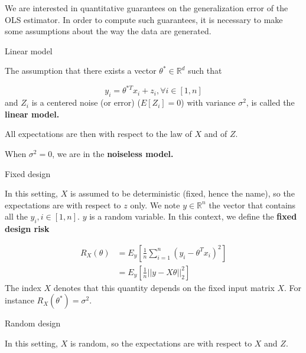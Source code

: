 \documentclass[
10pt, %
a4paper, %
oneside, %
headinclude,footinclude, %
BCOR5mm, %
]{scrartcl}
\begin{document}
We are interested in quantitative guarantees on the generalization error of the OLS estimator. In order to compute such guarantees, it is necessary to make some assumptions about the way the data are generated.

\begin{definition}{Linear model}

    The assumption that there exists a vector $ \theta^*\in \mathbb{R}^d$ such that 

    \begin{equation*}
	y_i = \theta^{*T}x_i+z_i, \forall i\in [1, n]
    \end{equation*}
    and $Z_i$ is a centered noise (or error)  ($E[Z_i]=0$) with variance $ \sigma^2$, is called the \textbf{{linear model.}} 
\end{definition}

All expectations are then with respect to the law of $X$ and of $Z$.

\begin{remark}

    When $\sigma^2=0$, we are in the \textbf{{noiseless model.}} 
    
\end{remark}

\begin{definition}{Fixed design}

    In this setting, $X$ is assumed to be deterministic (fixed, hence the name), so the expectations are with respect to $z$ only. We note $y\in \mathbb{R}^n$ the vector that contains all the $y_i, i\in [1, n]$. $y$ is a random variable. In this context, we define the \textbf{{fixed design risk}} 

    \begin{equation}
	\begin{aligned}
	    \label{eq:}
	    R_X(\theta)    &= E_y[ \frac{1}{n} \sum^{n}_{i=1} (y_i-\theta^Tx_i)^2]\\
	    &= E_y[ \frac{1}{n} ||y-X\theta||_2^2]
	\end{aligned}
    \end{equation}
    The index $X$ denotes that this quantity depends on the fixed input matrix $X$. For instance $ R_X(\theta^*) = \sigma^2$. 
\end{definition}

\begin{definition}{Random design}

    In this setting, $X$ is random, so the expectations are with respect to $X$ and $Z$.
\end{definition}
\end{document}
